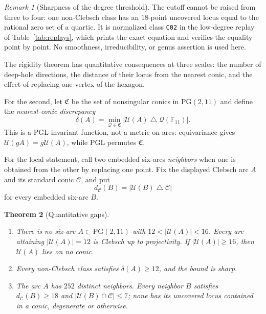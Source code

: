 \documentclass[11pt]{article}
\newtheorem{theorem}{Theorem}[section]
\theoremstyle{definition}
\theoremstyle{remark}
\newtheorem{remark}[theorem]{Remark}
\newcommand{\PG}{\mathrm{PG}}
\newcommand{\F}{\mathbb{F}}
\newcommand{\cC}{\mathcal{C}}
\newcommand{\cU}{\mathcal{U}}
\begin{document}
\begin{remark}[Sharpness of the degree threshold]
\label{rem:degree-threshold}
The cutoff cannot be raised from three to four: one non-Clebsch class has
an $18$-point uncovered locus equal to the rational zero set of a quartic.
It is normalized class \texttt{C02} in the low-degree replay of
Table~\ref{tab:replays}, which prints the exact equation and verifies the
equality point by point.  No smoothness, irreducibility, or genus assertion
is used here.
\end{remark}

The rigidity theorem has quantitative consequences at three scales: the
number of deep-hole directions, the distance of their locus from the
nearest conic, and the effect of replacing one vertex of the hexagon.

For the second, let $\mathfrak C$ be the set of nonsingular conics in
$\PG(2,11)$ and define the \emph{nearest-conic discrepancy}
\[
 \delta(A)=\min_{\mathcal Q\in\mathfrak C}
   |\cU(A)\mathbin{\triangle}\mathcal Q(\F_{11})|.
\]
This is a PGL-invariant function, not a metric on arcs: equivariance gives
$\cU(gA)=g\cU(A)$, while PGL permutes $\mathfrak C$.

For the local statement, call two embedded six-arcs \emph{neighbors} when
one is obtained from the other by replacing one point. Fix the displayed
Clebsch arc $A$ and its standard conic $\cC$, and put
\[
 d_{\cC}(B)=|\cU(B)\mathbin{\triangle}\cC|
\]
for every embedded six-arc $B$.

\begin{theorem}[Quantitative gaps]
\label{thm:gap}
\begin{enumerate}[label=(\alph*),leftmargin=2em]
\item There is no six-arc $A\subset\PG(2,11)$ with
$12<|\cU(A)|<16$. Every arc attaining $|\cU(A)|=12$ is Clebsch up to
projectivity. If $|\cU(A)|\ge16$, then $\cU(A)$ lies on no conic.
\item Every non-Clebsch class satisfies $\delta(A)\ge12$, and the bound is
sharp.
\item The arc $A$ has $252$ distinct neighbors. Every neighbor $B$ satisfies
$d_{\cC}(B)\ge18$ and $|\cU(B)\cap\cC|\le7$; none has its uncovered locus
contained in a conic, degenerate or otherwise.
\end{enumerate}
\end{theorem}
\end{document}
